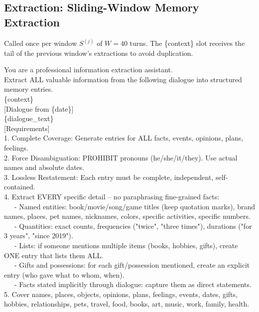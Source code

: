 \subsection{Extraction: Sliding-Window Memory Extraction}
\label{app:prompt_extract}

Called once per window $S^{(j)}$ of $W{=}40$ turns. The \{context\} slot receives the tail of the previous window's extractions to avoid duplication.

\begin{tcolorbox}[title={\textbf{Extraction: System + User Prompt}}, breakable, colback=blue!3, colframe=blue!40]
\small\ttfamily
You are a professional information extraction assistant.\\
Extract ALL valuable information from the following dialogue into structured memory entries.\\[0.3em]
\{context\}\\[0.3em]
{[Dialogue from \{date\}]}\\
\{dialogue\_text\}\\[0.3em]
{[Requirements]}\\
1. Complete Coverage: Generate entries for ALL facts, events, opinions, plans, feelings.\\
2. Force Disambiguation: PROHIBIT pronouns (he/she/it/they). Use actual names and absolute dates.\\
3. Lossless Restatement: Each entry must be complete, independent, self-contained.\\
4. Extract EVERY specific detail -- no paraphrasing fine-grained facts:\\
\ \ \ - Named entities: book/movie/song/game titles (keep quotation marks), brand names, places, pet names, nicknames, colors, specific activities, specific numbers.\\
\ \ \ - Quantities: exact counts, frequencies ("twice", "three times"), durations ("for 3 years", "since 2019").\\
\ \ \ - Lists: if someone mentions multiple items (books, hobbies, gifts), create ONE entry that lists them ALL.\\
\ \ \ - Gifts and possessions: for each gift/possession mentioned, create an explicit entry (who gave what to whom, when).\\
\ \ \ - Facts stated implicitly through dialogue: capture them as direct statements.\\
5. Cover names, places, objects, opinions, plans, feelings, events, dates, gifts, hobbies, relationships, pets, travel, food, books, art, music, work, family, health.\\[0.3em]

\end{tcolorbox}

